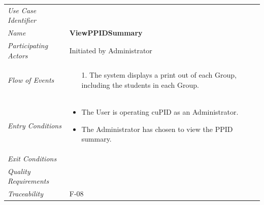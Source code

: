 \documentclass[12pt,letterpaper]{article}
\begin{document}
\begin{center}
	\begin{tabu} to 
		\toprule
		Use Case Identifier & \viewppidsummary{} \\
		Name & {\bf ViewPPIDSummary} \\
		Participating Actors & Initiated by Administrator \\
		Flow of Events & 
		\begin{minipage}[t]{\linewidth}
		    \begin{enumerate}
		        \item[1.] The system displays a print out of each Group, including the students in each Group.
			\end{enumerate}
	    \end{minipage} \\

		Entry Conditions &
		\begin{minipage}[t]{\linewidth}
			\begin{itemize}
			    \item The User is operating cuPID as an Administrator.
			    \item The Administrator has chosen to view the PPID summary.
	        \end{itemize}
	    \end{minipage} \\

		Exit Conditions & \\

		Quality Requirements & \\

		Traceability & F-08 \\
		\toprule
	\end{tabu}
\end{center}
\end{document}
